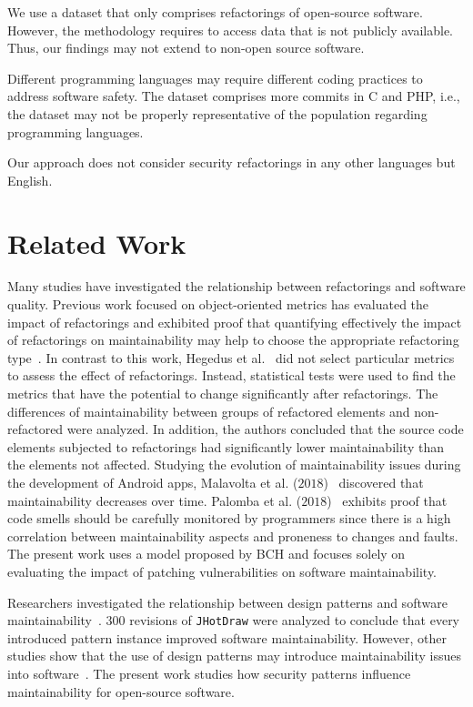 \documentclass[10pt,conference]{IEEEtran}
\begin{document}
We use a dataset that only comprises refactorings of open-source software.
However, the methodology requires to access data that is not publicly available.
Thus, our findings may not extend to non-open source software.

Different programming languages may require different coding practices to
address software safety. The dataset comprises more commits in C and PHP, i.e.,
the dataset may not be properly representative of the population regarding
programming languages.

Our approach does not consider security refactorings in any other languages but
English.

\section{Related Work}\label{sec:rw}

Many studies have investigated the relationship between refactorings and
software quality. Previous work focused on object-oriented metrics has evaluated the
impact of refactorings and exhibited proof that quantifying effectively the
impact of refactorings on maintainability may help to choose the appropriate
refactoring type~\cite{1167822}. In contrast to this work, Hegedus et
al.~\cite{HEGEDUS2018313} did not select particular metrics to assess the effect
of refactorings. Instead, statistical tests were used to find the metrics that
have the potential to change significantly after refactorings. The differences
of maintainability between groups of refactored elements and non-refactored were
analyzed. In addition, the authors concluded that the source code elements
subjected to refactorings had significantly lower maintainability than the
elements not affected. Studying the evolution of maintainability issues during
the development of Android apps, Malavolta et al. ($2018$)~\cite{8530041}
discovered that maintainability decreases over time. Palomba et al.
($2018$)~\cite{Palomba:2018:DIM:3231288.3231337} exhibits proof that code smells
should be carefully monitored by programmers since there is a high correlation
between maintainability aspects and proneness to changes and faults. The present
work uses a model proposed by BCH and focuses solely on evaluating the impact of
patching vulnerabilities on software maintainability.

Researchers investigated the relationship between design patterns and software
maintainability~\cite{10.1007/978-3-642-35267-6-18}. $300$ revisions of
\texttt{JHotDraw} were analyzed to conclude that every introduced pattern
instance improved software maintainability. However, other studies show that the
use of design patterns may introduce maintainability issues into
software~\cite{4493325}. The present work studies how security patterns
influence maintainability for open-source software.
\end{document}
